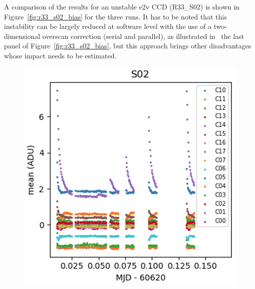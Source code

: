 A comparison of the results for an unstable e2v CCD (R33\_S02) is shown in Figure~\ref{fig:r33_s02_bias} for the
three runs. It has to be noted that this instability can be largely reduced at software level with the use of a two-dimensional overscan correction (serial and parallel), as illustrated in \
the last panel of Figure~\ref{fig:r33_s02_bias}, but this approach brings other disadvantages whose impact needs to be estimated.

\begin{figure}[htbp]
\centering
\begin{minipage}[b]{0.45\textwidth}
    \centering
    \includegraphics[width=\textwidth]{figures/E2136_R33_S02.png}
\end{minipage}
\hspace{0.05\textwidth}
\begin{minipage}[b]{0.45\textwidth}
    \centering

\end{minipage}
\end{figure}
